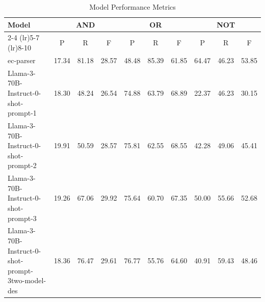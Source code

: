 \begin{table}[h]
\centering
\begin{tabular}{lccccccccc}
\toprule
Model & \multicolumn{3}{c}{AND} & \multicolumn{3}{c}{OR} & \multicolumn{3}{c}{NOT} \\
\cmidrule(lr){2-4}  \cmidrule(lr){5-7}  \cmidrule(lr){8-10}
 & P & R & F & P & R & F & P & R & F \\
\midrule
ec-parser & 17.34 & 81.18 & 28.57 & 48.48 & 85.39 & 61.85 & 64.47 & 46.23 & 53.85 \\
Llama-3-70B-Instruct-0-shot-prompt-1 & 18.30 & 48.24 & 26.54 & 74.88 & 63.79 & 68.89 & 22.37 & 46.23 & 30.15 \\
Llama-3-70B-Instruct-0-shot-prompt-2 & 19.91 & 50.59 & 28.57 & 75.81 & 62.55 & 68.55 & 42.28 & 49.06 & 45.41 \\
Llama-3-70B-Instruct-0-shot-prompt-3 & 19.26 & 67.06 & 29.92 & 75.64 & 60.70 & 67.35 & 50.00 & 55.66 & 52.68 \\
Llama-3-70B-Instruct-0-shot-prompt-3two-model-des & 18.36 & 76.47 & 29.61 & 76.77 & 55.76 & 64.60 & 40.91 & 59.43 & 48.46 \\
\bottomrule
\end{tabular}
\caption{Model Performance Metrics}
\label{tab:model_metrics}
\end{table}
